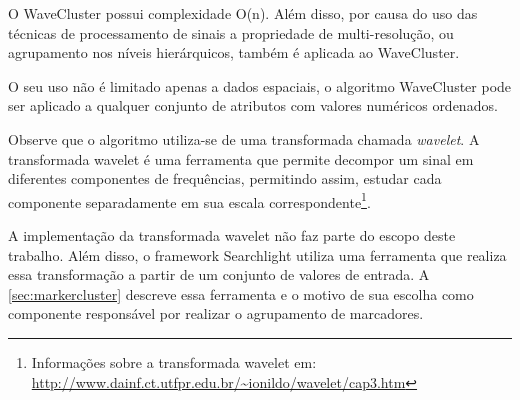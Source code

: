 O WaveCluster possui complexidade O(n). Além disso, por causa do uso das técnicas de processamento de sinais a propriedade de multi-resolução, ou agrupamento nos níveis hierárquicos, também é aplicada ao WaveCluster.

O seu uso não é limitado apenas a dados espaciais, o algoritmo WaveCluster pode ser aplicado a qualquer conjunto de atributos com valores numéricos ordenados.

Observe que o algoritmo utiliza-se de uma transformada chamada \textit{wavelet}. A transformada wavelet é uma ferramenta que permite decompor um sinal em diferentes componentes de frequências, permitindo assim, estudar cada componente separadamente em sua escala correspondente\footnote{ Informações sobre a transformada wavelet em: \url{http://www.dainf.ct.utfpr.edu.br/~ionildo/wavelet/cap3.htm}}. 

A implementação da transformada wavelet não faz parte do escopo deste trabalho. Além disso, o framework Searchlight utiliza uma ferramenta que realiza essa transformação a partir de um conjunto de valores de entrada. A \autoref{sec:markercluster} descreve essa ferramenta e o motivo de sua escolha como componente responsável por realizar o agrupamento de marcadores.
	